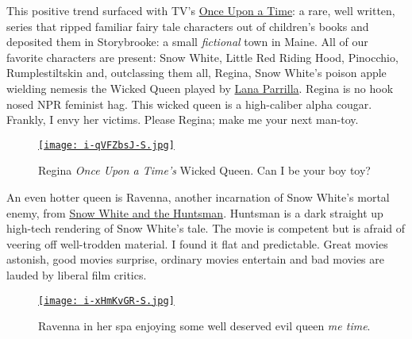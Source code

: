 This positive trend surfaced with TV's
\href{http://www.imdb.com/title/tt1843230/}{Once Upon a Time}: a rare,
well written, series that ripped familiar fairy tale characters out of
children's books and deposited them in Storybrooke: a small
\emph{fictional} town in Maine. All of our favorite characters are
present: Snow White, Little Red Riding Hood, Pinocchio, Rumplestiltskin
and, outclassing them all, Regina, Snow White's poison apple wielding
nemesis the Wicked Queen played by
\href{http://www.imdb.com/name/nm0663469/}{Lana Parrilla}. Regina is no
hook nosed NPR feminist hag. This wicked queen is a high-caliber alpha
cougar. Frankly, I envy her victims. Please Regina; make me your next
man-toy.

\captionsetup[figure]{labelformat=empty}
\begin{SCfigure}[1.5][!h]
\centering
\href{http://beta.abc.go.com/shows/once-upon-a-time}{\texttt{[image: i-qVFZbsJ-S.jpg]}}
\caption{Regina \emph{Once Upon a Time's} Wicked Queen. Can I be your boy toy?}
\label{fig:2887X0}
\end{SCfigure}

An even hotter queen is Ravenna, another incarnation of Snow White's
mortal enemy, from
\href{http://www.rottentomatoes.com/m/snow\_white\_and\_the\_huntsman/}{Snow
White and the Huntsman}. Huntsman is a dark straight up high-tech
rendering of Snow White's tale. The movie is competent but is afraid of
veering off well-trodden material. I found it flat and predictable.
Great movies astonish, good movies surprise, ordinary movies entertain
and bad movies are lauded by liberal film critics.


%

\captionsetup[figure]{labelformat=empty}
\begin{SCfigure}[1.5][!h]
\centering
\href{http://www.snowwhiteandthehuntsman.com/}{\texttt{[image: i-xHmKvGR-S.jpg]}}
\caption{Ravenna in her spa enjoying some well deserved evil queen \emph{me time}.}
\label{fig:2887X1}
\end{SCfigure}

